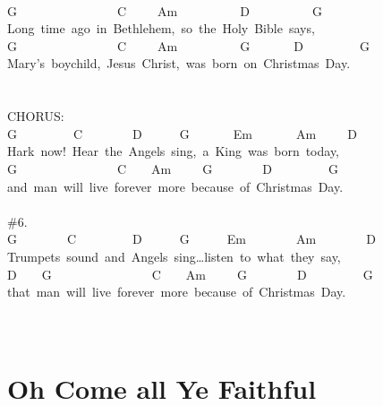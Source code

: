 \documentclass[]{book}
\let\stdsection\section
\renewcommand\section{\clearpage\stdsection}
\begin{document}
~\\
G~~~~~~~~~~~~~~~~C~~~~~Am~~~~~~~~~~D~~~~~~~~~~G~\\
Long~time~ago~in~Bethlehem,~so~the~Holy~Bible~says,~~\\
G~~~~~~~~~~~~~~~~C~~~~~Am~~~~~~~~~~G~~~~~~~D~~~~~~~~~G~\\
Mary's~boychild,~Jesus~Christ,~was~born~on~Christmas~Day.~\\
~\\
\hspace*{0.333em}\hspace*{0.333em}\\
CHORUS:\\
G~~~~~~~~~C~~~~~~~~D~~~~~~G~~~~~~~Em~~~~~~~Am~~~~~D~\\
Hark~now!~Hear~the~Angels~sing,~a~King~was~born~today,~\\
\hspace*{0.333em}\hspace*{0.333em}\hspace*{0.333em}\hspace*{0.333em}G~~~~~~~~~~~~~~~~C~~~~Am~~~~~G~~~~~~~~D~~~~~~~~~G~\\
and~man~will~live~forever~more~because~of~Christmas~Day.\\
~\\
\#6.~\\
G~~~~~~~~C~~~~~~~~~D~~~~~~G~~~~~~Em~~~~~~~~Am~~~~~~~~D~\\
Trumpets~sound~and~Angels~sing\ldots listen~to~what~they~say,~\\
D~~~~G~~~~~~~~~~~~~~~~C~~~~Am~~~~~G~~~~~~~~D~~~~~~~~~G~\\
that~man~will~live~forever~more~because~of~Christmas~Day.\\
~\\
~\\

\hypertarget{oh-come-all-ye-faithful}{%
\section{Oh Come all Ye Faithful}\label{oh-come-all-ye-faithful}}
\end{document}

